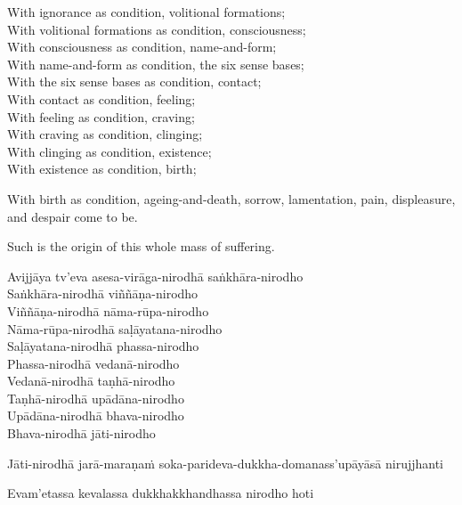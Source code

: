 \begin{english-verses}
  With ignorance as condition, volitional formations;\\
  With volitional formations as condition, consciousness;\\
  With consciousness as condition, name-and-form;\\
  With name-and-form as condition, the six sense bases;\\
  With the six sense bases as condition, contact;\\
  With contact as condition, feeling;\\
  With feeling as condition, craving;\\
  With craving as condition, clinging;\\
  With clinging as condition, existence;\\
  With existence as condition, birth;
  \begin{english-hangtogether-verses}
    With birth as condition, ageing-and-death, sorrow, lamentation, pain, displeasure, and despair come to be.
  \end{english-hangtogether-verses}
  \begin{english-hangtogether-verses}
    Such is the origin of this whole mass of suffering.
  \end{english-hangtogether-verses}
\end{english-verses}

\begin{pali-hang-continued}
  Avijjāya tv'eva asesa-virāga-nirodhā saṅkhāra-nirodho\\
  Saṅkhāra-nirodhā viññāṇa-nirodho\\
  Viññāṇa-nirodhā nāma-rūpa-nirodho\\
  Nāma-rūpa-nirodhā saḷāyatana-nirodho\\
  Saḷāyatana-nirodhā phassa-nirodho\\
  Phassa-nirodhā vedanā-nirodho\\
  Vedanā-nirodhā taṇhā-nirodho\\
  Taṇhā-nirodhā upādāna-nirodho\\
  Upādāna-nirodhā bhava-nirodho\\
  Bhava-nirodhā jāti-nirodho
  \begin{pali-hangtogether}
    Jāti-nirodhā jarā-maraṇaṁ soka-parideva-dukkha-domanass'upāyāsā nirujjhanti
  \end{pali-hangtogether}
  \begin{pali-hangtogether}
    Evam'etassa kevalassa dukkhakkhandhassa nirodho hoti
  \end{pali-hangtogether}
\end{pali-hang-continued}

